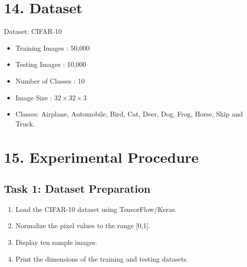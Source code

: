 \documentclass[11pt]{article}
\begin{document}

\section*{14. Dataset}

Dataset: CIFAR-10

\begin{itemize}

\item Training Images : 50,000

\item Testing Images : 10,000

\item Number of Classes : 10

\item Image Size : $32\times32\times3$

\item Classes:
Airplane, Automobile, Bird, Cat, Deer,
Dog, Frog, Horse, Ship and Truck.

\end{itemize}


\section*{15. Experimental Procedure}

\subsection*{Task 1: Dataset Preparation}

\begin{enumerate}

\item Load the CIFAR-10 dataset using TensorFlow/Keras.

\item Normalize the pixel values to the range [0,1].

\item Display ten sample images.

\item Print the dimensions of the training and testing datasets.

\end{enumerate}

\end{document}
